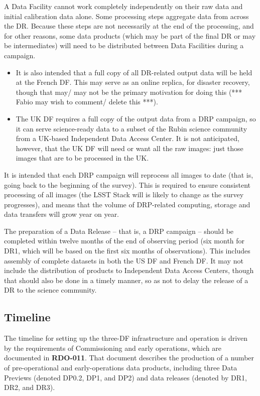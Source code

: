 A Data Facility cannot work completely independently on their raw data and initial calibration data alone. Some processing steps aggregate data from across the DR. Because these steps are not necessarily at the end of the processing, and for other reasons, some data products (which may be part of the final DR or may be intermediates) will need to be distributed between Data Facilities during a campaign.

\begin{itemize}

  \item It is also intended that a full copy of all DR-related output data will be held at the French DF. This may serve as an online replica, for disaster recovery, though that may/ may not be the primary motivation for doing this (*** Fabio may wish to comment/ delete this ***).

  \item The UK DF requires a full copy of the output data from a DRP campaign, so it can serve science-ready data to a subset of the Rubin science community from a UK-based Independent Data Access Center. It is not anticipated, however, that the UK DF will need or want all the raw images: just those images that are to be processed in the UK.
    
\end{itemize}

It is intended that each DRP campaign will reprocess all images to
date (that is, going back to the beginning of the survey). This is
required to ensure consistent processing of all images (the LSST Stack
will is likely to change as the survey progresses), and means that the
volume of DRP-related computing, storage and data transfers will grow
year on year.

The preparation of a Data Release – that is, a DRP campaign – should be completed within twelve months of the end of observing period (six month for DR1, which will be based on the first six months of observations). This includes assembly of complete datasets in both the US DF and French DF. It may not include the distribution of products to Independent Data Access Centers, though that should also be done in a timely manner, so as not to delay the release of a DR to the science community.

\subsection{Timeline}

The timeline for setting up the three-DF infrastructure and operation
is driven by the requirements of Commissioning and early operations,
which are documented in {\bf RDO-011}. That document describes the
production of a number of pre-operational and early-operations data
products, including three Data Previews (denoted DP0.2, DP1, and DP2)
and data releases (denoted by DR1, DR2, and DR3).

